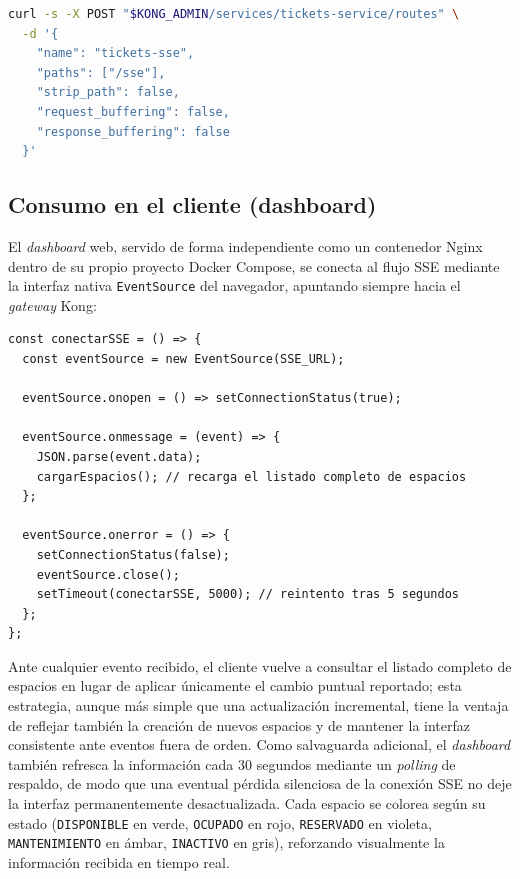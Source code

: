 \documentclass[12pt,letterpaper]{article}
\begin{document}
\begin{lstlisting}[language=bash,caption={Registro de la ruta SSE en Kong sin buffering (setup-kong.sh)}]
curl -s -X POST "$KONG_ADMIN/services/tickets-service/routes" \
  -d '{
    "name": "tickets-sse",
    "paths": ["/sse"],
    "strip_path": false,
    "request_buffering": false,
    "response_buffering": false
  }'
\end{lstlisting}

\subsection{Consumo en el cliente (dashboard)}

El \emph{dashboard} web, servido de forma independiente como un contenedor Nginx dentro de su propio proyecto Docker Compose, se conecta al flujo SSE mediante la interfaz nativa \texttt{EventSource} del navegador, apuntando siempre hacia el \emph{gateway} Kong:

\begin{lstlisting}[language=JavaScriptDoc,caption={Conexión al flujo SSE desde el dashboard (app.js)}]
const conectarSSE = () => {
  const eventSource = new EventSource(SSE_URL);

  eventSource.onopen = () => setConnectionStatus(true);

  eventSource.onmessage = (event) => {
    JSON.parse(event.data);
    cargarEspacios(); // recarga el listado completo de espacios
  };

  eventSource.onerror = () => {
    setConnectionStatus(false);
    eventSource.close();
    setTimeout(conectarSSE, 5000); // reintento tras 5 segundos
  };
};
\end{lstlisting}

Ante cualquier evento recibido, el cliente vuelve a consultar el listado completo de espacios en lugar de aplicar únicamente el cambio puntual reportado; esta estrategia, aunque más simple que una actualización incremental, tiene la ventaja de reflejar también la creación de nuevos espacios y de mantener la interfaz consistente ante eventos fuera de orden. Como salvaguarda adicional, el \emph{dashboard} también refresca la información cada 30 segundos mediante un \emph{polling} de respaldo, de modo que una eventual pérdida silenciosa de la conexión SSE no deje la interfaz permanentemente desactualizada. Cada espacio se colorea según su estado (\texttt{DISPONIBLE} en verde, \texttt{OCUPADO} en rojo, \texttt{RESERVADO} en violeta, \texttt{MANTENIMIENTO} en ámbar, \texttt{INACTIVO} en gris), reforzando visualmente la información recibida en tiempo real.
\end{document}
